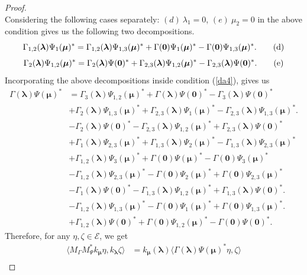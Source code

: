 \documentclass[12pt]{amsart}
\theoremstyle{definition}
\newcommand{\1}{{\mbox{\bf 1}}}
\newcommand{\cle}{\mathcal{E}}
\begin{document}
\begin{proof}
\[\]
Considering the following cases separately: $(d)~\lambda_1 =0 $, $(e)~\mu_2 = 0$ in the above condition gives us the following two decompositions.
\[
\Gamma_{1,2}(\bm{\lambda}) \Psi_{1}(\bm{\mu})^* =  \Gamma_{1,2}(\bm{\lambda})\Psi_{1,3}(\bm{\mu})^* + \Gamma (\bm{0}) \Psi_{1}(\bm{\mu})^* - \Gamma (\bm{0}) \Psi_{1,3}(\bm{\mu})^*. \tag{\text{d}}
\]
\[
\Gamma_2(\bm{\lambda}) \Psi_{1,2}(\bm{\mu})^* =  \Gamma_2(\bm{\lambda}) \Psi(\bm{0})^*+ \Gamma_{2,3}(\bm{\lambda}) \Psi_{1,2}(\bm{\mu})^* - \Gamma_{2,3}(\bm{\lambda}) \Psi(\bm{0})^*.  \tag{\text{e}}
\]
Incorporating the above decompositions inside condition (\ref{da4}), gives us
\begin{equation}\label{da5}
\begin{split}
\Gamma(\bm{\lambda})  \Psi(\bm{\mu})^* &=  \Gamma_3(\bm{\lambda}) \Psi_{1,2}(\bm{\mu})^* + \Gamma(\bm{\lambda}) \Psi(\bm{0})^* - \Gamma_3(\bm{\lambda}) \Psi(\bm{0})^* \\
&+ \Gamma_2(\bm{\lambda})\Psi_{1,3}(\bm{\mu})^* + \Gamma_{2,3}(\bm{\lambda}) \Psi_{1}(\bm{\mu})^* - \Gamma_{2,3}(\bm{\lambda}) \Psi_{1,3}(\bm{\mu})^*. \\
&- \Gamma_2(\bm{\lambda}) \Psi(\bm{0})^*- \Gamma_{2,3}(\bm{\lambda}) \Psi_{1,2}(\bm{\mu})^* + \Gamma_{2,3}(\bm{\lambda}) \Psi(\bm{0})^*\\
&+ \Gamma_1(\bm{\lambda})  \Psi_{2,3}(\bm{\mu})^* +  \Gamma_{1,3}(\bm{\lambda}) \Psi_{2}(\bm{\mu})^* - \Gamma_{1,3}(\bm{\lambda}) \Psi_{2,3}(\bm{\mu})^* \\
&+ \Gamma_{1,2}(\bm{\lambda})\Psi_{3}(\bm{\mu})^* + \Gamma(\bm{0})\Psi(\bm{\mu})^* - \Gamma(\bm{0})  \Psi_{3}(\bm{\mu})^*\\
\
&- \Gamma_{1,2}(\bm{\lambda}) \Psi_{2,3}(\bm{\mu})^* - \Gamma(\bm{0}) \Psi_{2}(\bm{\mu})^* + \Gamma(\bm{0}) \Psi_{2,3}(\bm{\mu})^* \\
&- \Gamma_1(\bm{\lambda}) \Psi(\bm{0})^* - \Gamma_{1,3}(\bm{\lambda}) \Psi_{1,2}(\bm{\mu})^* + \Gamma_{1,3}(\bm{\lambda}) \Psi(\bm{0})^*.\\
&- \Gamma_{1,2}(\bm{\lambda})\Psi_{1,3}(\bm{\mu})^* - \Gamma (\bm{0}) \Psi_{1}(\bm{\mu})^* + \Gamma (\bm{0}) \Psi_{1,3}(\bm{\mu})^*. \\
&+ \Gamma_{1,2}(\bm{\lambda}) \Psi(\bm{0})^* + \Gamma(\bm{0}) \Psi_{1,2}(\bm{\mu})^* - \Gamma(\bm{0}) \Psi(\bm{0})^*.
\end{split}
\end{equation}
Therefore, for any $\eta, \zeta \in \cle$, we get
\begin{align*}
\langle M_{\Gamma}M_{\Psi}^* k_{\bm{\mu}} \eta, k_{\bm{\lambda}} \zeta \rangle &= k_{\bm{{\mu}}}(\bm{\lambda}) \langle  \Gamma(\bm{\lambda})\Psi(\bm{\mu})^*  \eta,  \zeta \rangle \\

\end{align*}
\end{proof}
\end{document}
